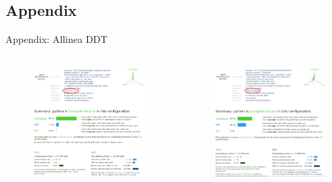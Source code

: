 \documentclass[pdf,aspectratio=169]{beamer}
\begin{document}
\subsection{Appendix}

\begin{frame}{Appendix: Allinea DDT}
  \vspace{-1em}
  \begin{columns}[T]
    \begin{column}[T]{0.45\textwidth}
      \begin{figure}
	\includegraphics[width=\textwidth]{ddt_32_circled}
      \end{figure}
    \end{column}
    \quad
    \begin{column}[T]{0.45\textwidth}
      \begin{figure}
	\includegraphics[width=\textwidth]{ddt_128_circled}

\end{figure}
\end{column}
\end{columns}
\end{frame}
\end{document}
